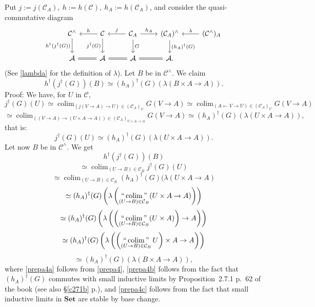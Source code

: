 \documentclass[12pt]{article}%
\theoremstyle{remark}
\theoremstyle{definition}
\newcommand{\A}{\mathcal A}
\newcommand{\C}{\mathcal C}
\newcommand{\Set}{\mathbf{Set}}
\DeclareMathOperator*{\colim}{colim}
\DeclareMathOperator*{\icolim}{``\colim"}
\begin{document}
Put $j:=j(\C_A),\ h:=h(\C),\ h_A:=h(\C_A)$, and consider the quasi-commutative diagram 
$$
\begin{tikzcd}
\C^\wedge\ar{d}[swap]{h^\dagger(j^\dagger(G))}&
\C\ar{l}[swap]{h}\ar{d}[swap]{j^\dagger(G)}&
\C_A\ar{l}[swap]{j}\ar{r}{h_A}\ar{d}{G}&
(\C_A)^\wedge\ar{d}{(h_A)^\dagger(G)}&
(\C^\wedge)_A\ar{l}[swap]{\lambda}\\ 
\A\ar[equal]{r}&\A\ar[equal]{r}&\A\ar[equal]{r}&\A.
\end{tikzcd}
$$ 
(See \eqref{lambda} for the definition of $\lambda$). Let $B$ be in $\C^\wedge$. We claim 
\begin{equation}\label{prepa3}
h^\dagger(j^\dagger(G))(B)\simeq(h_A)^\dagger(G)(\lambda(B\times A\to A)).
\end{equation} 
Proof: We have, for $U$ in $\C$, 
$$
j^\dagger(G)(U)\simeq\colim_{(j(V\to A)\to U)\in(\C_A)_U}G(V\to A)\simeq\colim_{(A\leftarrow V\to U)\in(\C_A)_U}G(V\to A)
$$
$$
\simeq\colim_{((V\to A)\to(U\times A\to A))\in(\C_A)_{U\times A\to A}}G(V\to A)\simeq(h_A)^\dagger(G)(\lambda(U\times A\to A)),
$$
that is: 
\begin{equation}\label{prepa4}
j^\dagger(G)(U)\simeq(h_A)^\dagger(G)(\lambda(U\times A\to A)).
\end{equation} 
Let now $B$ be in $\C^\wedge$. We get 
$$
h^\dagger(j^\dagger(G))(B)
$$
$$
\simeq\colim_{(U\to B)\in\C_B}j^\dagger(G)(U)
$$ 
\begin{equation}\label{prepa4a}
\simeq\colim_{(U\to B)\in\C_B}(h_A)^\dagger(G)(\lambda(U\times A\to A)
\end{equation} 
\begin{equation}\label{prepa4b}
\simeq(h_A)^\dagger(G)\left(\lambda\left(\icolim_{(U\to B)\in\C_B}(U\times A\to A)\right)\right)
\end{equation} 
$$
\simeq(h_A)^\dagger(G)\left(\lambda\left(\left(\icolim_{(U\to B)\in\C_B}(U\times A)\right)\to A\right)\right)
$$
\begin{equation}\label{prepa4c}
\simeq(h_A)^\dagger(G)\left(\lambda\left(\left(\icolim_{(U\to B)\in\C_B}U\right)\times A\to A\right)\right)
\end{equation} 
$$
\simeq(h_A)^\dagger(G)(\lambda(B\times A\to A)),
$$ 
where \eqref{prepa4a} follows from \eqref{prepa4}, \eqref{prepa4b} follows from the fact that $(h_A)^\dagger(G)$ commutes with small inductive limits by Proposition~2.7.1 p.~62 of the book (see also \S\ref{c271b} p.\pageref{c271b}), and \eqref{prepa4c} follows from the fact that small inductive limits in $\Set$ are stable by base change.
\end{document}
